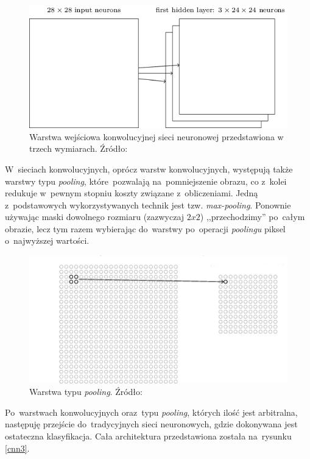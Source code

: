 \begin{figure}[ht!]
\centering
\includegraphics[scale=0.6]{res/cnn2.png}
\caption[Caption for LOF]{Warstwa wejściowa konwolucyjnej sieci neuronowej przedstawiona w trzech wymiarach. Źródło:\cite{nielsen}\label{cnn2}} 
\end{figure}

W~sieciach konwolucyjnych, oprócz warstw konwolucyjnych, występują także warstwy typu \textit{pooling}, które~pozwalają na~pomniejszenie obrazu, co z~kolei redukuje w~pewnym stopniu koszty związane z~obliczeniami. Jedną z~podstawowych wykorzystywanych technik jest tzw. \textit{max-pooling}. Ponownie używając maski dowolnego rozmiaru (zazwyczaj $2x2$) ,,przechodzimy'' po~całym obrazie, lecz tym razem wybierając do~warstwy po~operacji \textit{poolingu} piksel o~najwyższej wartości.

\begin{figure}[ht!]
\centering
\includegraphics[scale=0.6]{res/pooling.png}
\caption[Caption for LOF]{Warstwa typu \textit{pooling}. Źródło:\cite{nielsen}\label{pooling}} 
\end{figure}

Po~warstwach konwolucyjnych oraz~typu \textit{pooling}, których ilość jest arbitralna, następuję przejście do~tradycyjnych sieci neuronowych, gdzie dokonywana jest ostateczna klasyfikacja. Cała architektura przedstawiona została na~rysunku \ref{cnn3}.

